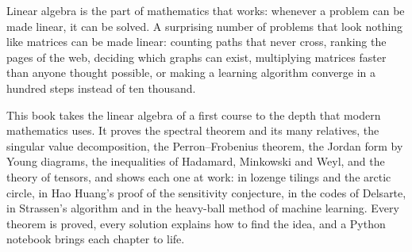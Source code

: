 Linear algebra is the part of mathematics that works: whenever a problem can be made linear, it can be
solved. A surprising number of problems that look nothing like matrices can be made linear: counting
paths that never cross, ranking the pages of the web, deciding which graphs can exist, multiplying
matrices faster than anyone thought possible, or making a learning algorithm converge in a hundred steps
instead of ten thousand.

This book takes the linear algebra of a first course to the depth that modern mathematics uses. It
proves the spectral theorem and its many relatives, the singular value decomposition, the Perron--Frobenius
theorem, the Jordan form by Young diagrams, the inequalities of Hadamard, Minkowski and Weyl, and the
theory of tensors, and shows each one at work: in lozenge tilings and the arctic circle, in Hao Huang's
proof of the sensitivity conjecture, in the codes of Delsarte, in Strassen's algorithm and in the
heavy-ball method of machine learning. Every theorem is proved, every solution explains how to find the idea,
and a Python notebook brings each chapter to life.
